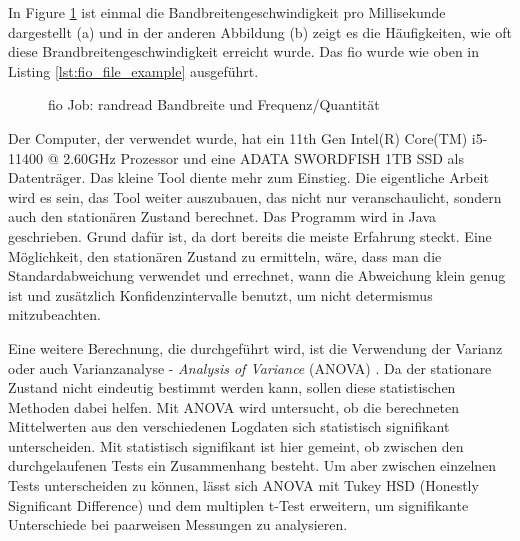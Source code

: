 \documentclass{article}
\begin{document}
\bigskip
In Figure \ref{fig:log_graphs}  ist einmal die Bandbreitengeschwindigkeit pro Millisekunde dargestellt (a) und in der anderen Abbildung (b) zeigt es die Häufigkeiten, 
wie oft diese Brandbreitengeschwindigkeit erreicht wurde. Das fio wurde wie oben in Listing \ref{lst:fio_file_example} ausgeführt.

\begin{figure}%
    \centering
    \qquad
    \caption{fio Job: randread Bandbreite und Frequenz/Quantität}%
    \label{fig:log_graphs}%
\end{figure}


Der Computer, der verwendet wurde, hat ein 11th Gen Intel(R) Core(TM) i5-11400 @ 2.60GHz Prozessor und eine ADATA SWORDFISH 1TB SSD  als Datenträger.
Das kleine Tool diente mehr zum Einstieg. Die eigentliche Arbeit wird es sein, das Tool weiter auszubauen, das nicht nur veranschaulicht,
sondern auch den stationären Zustand berechnet.
Das Programm wird in Java geschrieben. Grund dafür ist, da dort bereits die meiste Erfahrung steckt.
Eine Möglichkeit, den stationären Zustand zu ermitteln, wäre, dass man die Standardabweichung verwendet und errechnet, wann die Abweichung klein genug ist und zusätzlich Konfidenzintervalle benutzt, um nicht determismus mitzubeachten.

Eine weitere Berechnung, die durchgeführt wird, ist die Verwendung der Varianz oder auch Varianzanalyse - \textit{Analysis of Variance} (ANOVA) \cite{stasticsInPerformance}.
Da der stationare Zustand nicht eindeutig bestimmt werden kann, sollen diese statistischen Methoden dabei helfen.
Mit ANOVA wird untersucht, ob die berechneten Mittelwerten aus den verschiedenen Logdaten sich statistisch signifikant unterscheiden. \cite{posthoc}
Mit statistisch signifikant ist hier gemeint, ob zwischen den durchgelaufenen Tests ein Zusammenhang besteht. 
Um aber zwischen einzelnen Tests unterscheiden zu können, lässt sich ANOVA mit Tukey HSD (Honestly Significant Difference) und dem multiplen t-Test erweitern, um signifikante Unterschiede bei paarweisen Messungen zu analysieren. 
\end{document}
